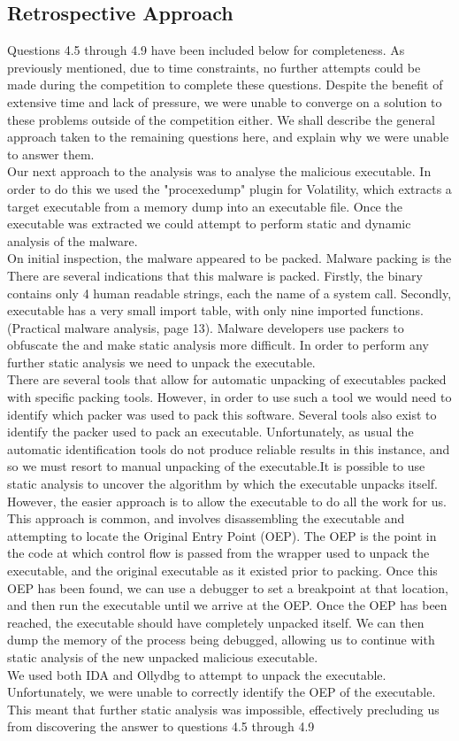 \subsection{Retrospective Approach}
Questions 4.5 through 4.9 have been included below for completeness. As previously mentioned, due to time constraints, no further attempts could be made during the competition to complete these questions. Despite the benefit of extensive time and lack of pressure, we were unable to converge on a solution to these problems outside of the competition either. We shall describe the general approach taken to the remaining questions here, and explain why we were unable to answer them.\\
Our next approach to the analysis was to analyse the malicious executable. In order to do this we used the "procexedump" plugin for Volatility, which extracts a target executable from a memory dump into an executable file. Once the executable was extracted we could attempt to perform static and dynamic analysis of the malware.\\
On initial inspection, the malware appeared to be packed. Malware packing is the There are several indications that this malware is packed. Firstly, the binary contains only 4 human readable strings, each the name of a system call. Secondly, executable has a very small import table, with only nine imported functions. (Practical malware analysis, page 13). 
Malware developers use packers to obfuscate the and make static analysis more difficult. In order to perform any further static analysis we need to unpack the executable.\\
There are several tools that allow for automatic unpacking of executables packed with specific packing tools. However, in order to use such a tool we would need to identify which packer was used to pack this software. Several tools also exist to identify the packer used to pack an executable. Unfortunately, as usual the automatic identification tools do not produce reliable results in this instance, and so we must resort to manual unpacking of the executable.It is possible to use static analysis to uncover the algorithm by which the executable unpacks itself. However, the easier approach is to allow the executable to do all the work for us. This approach is common, and involves disassembling the executable and attempting to locate the Original Entry Point (OEP). The OEP is the point in the code at which control flow is passed from the wrapper used to unpack the executable, and the original executable as it existed prior to packing. Once this OEP has been found, we can use a debugger to set a breakpoint at that location, and then run the executable until we arrive at the OEP. Once the OEP has been reached, the executable should have completely unpacked itself. We can then dump the memory of the process being debugged, allowing us to continue with static analysis of the new unpacked malicious executable.\\
We used both IDA and Ollydbg to attempt to unpack the executable. Unfortunately, we were unable to correctly identify the OEP of the executable. This meant that further static analysis was impossible, effectively precluding us from discovering the answer to questions 4.5 through 4.9\\ 


